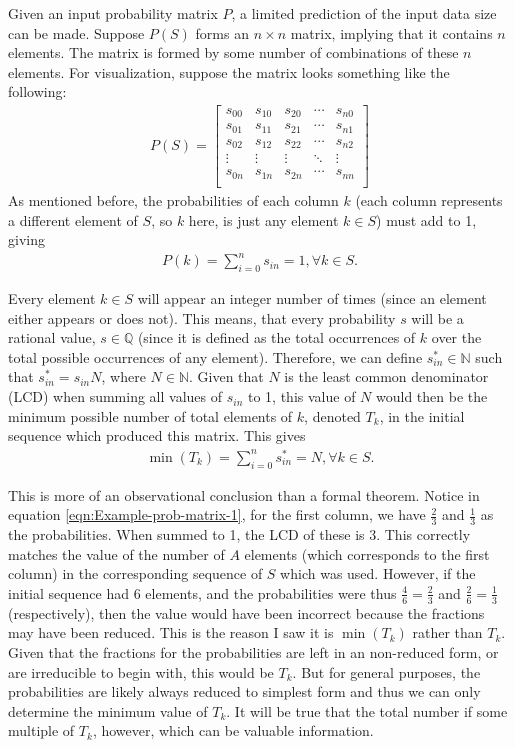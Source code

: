 Given an input probability matrix $P$, a limited prediction of the input data
size can be made. Suppose $P(S)$ forms an $n \times n$ matrix, implying that it contains $n$ elements. The matrix is formed by some number of combinations of these $n$ elements. For visualization, suppose the matrix looks something like the following:
\begin{align}
P(S) = \left[
\begin{matrix}
s_{00} & s_{10} & s_{20} & \cdots & s_{n0} \\
s_{01} & s_{11} & s_{21} & \cdots & s_{n1} \\
s_{02} & s_{12} & s_{22} & \cdots & s_{n2} \\
\vdots & \vdots & \vdots & \ddots & \vdots \\
s_{0n} & s_{1n} & s_{2n} & \cdots & s_{nn} \\
\end{matrix}\right]
\end{align}
As mentioned before, the probabilities of each column $k$ (each column represents a different element of $S$, so $k$ here, is just any element $k \in S$) must add to 1, giving
\begin{align}
P(k) = \sum_{i=0}^{n}s_{in} = 1, \forall k \in S.
\end{align}

Every element $k\in S$ will appear an integer number of times (since an element either appears or does not). This means, that every probability $s$ will be a rational value, $s\in\mathbb{Q}$ (since it is defined as the total occurrences of $k$ over the total possible occurrences of any element). Therefore, we can define $s^*_{in}\in \mathbb{N}$ such that $s^*_{in} = s_{in}N$, where $N\in\mathbb{N}$. Given that $N$ is the least common denominator (LCD) when summing all values of $s_{in}$ to 1, this value of $N$ would then be the minimum possible number of total elements of $k$, denoted $T_k$, in the initial sequence which produced this matrix. This gives
\begin{align}
\min (T_k) = \sum_{i=0}^{n}s^*_{in} = N, \forall k \in S.
\end{align}

This is more of an observational conclusion than a formal theorem. Notice in equation \ref{eqn:Example-prob-matrix-1}, for the first column, we have $\frac{2}{3}$ and $\frac{1}{3}$ as the probabilities. When summed to 1, the LCD of these is 3. This correctly matches the value of the number of $A$ elements (which corresponds to the first column) in the corresponding sequence of $S$ which was used. However, if the initial sequence had 6 elements, and the probabilities were thus $\frac{4}{6} = \frac{2}{3}$ and $\frac{2}{6} = \frac{1}{3}$ (respectively), then the value would have been incorrect because the fractions may have been reduced. This is the reason I saw it is $\min (T_k)$ rather than $T_k$. Given that the fractions for the probabilities are left in an non-reduced form, or are irreducible to begin with, this would be $T_k$. But for general purposes, the probabilities are likely always reduced to simplest form and thus we can only determine the minimum value of $T_k$. It will be true that the total number if some multiple of $T_k$, however, which can be valuable information.


